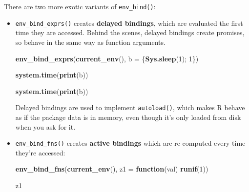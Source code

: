 \documentclass[]{book}
\newenvironment{Shaded}{\begin{snugshade}}{\end{snugshade}}
\newcommand{\ControlFlowTok}[1]{\textcolor[rgb]{0.13,0.29,0.53}{\textbf{#1}}}
\newcommand{\DataTypeTok}[1]{\textcolor[rgb]{0.13,0.29,0.53}{#1}}
\newcommand{\DecValTok}[1]{\textcolor[rgb]{0.00,0.00,0.81}{#1}}
\newcommand{\KeywordTok}[1]{\textcolor[rgb]{0.13,0.29,0.53}{\textbf{#1}}}
\newcommand{\NormalTok}[1]{#1}
\theoremstyle{definition}
\theoremstyle{definition}
\theoremstyle{definition}
\theoremstyle{remark}
\begin{document}
There are two more exotic variants of \texttt{env\_bind()}:

\begin{itemize}
\item
  \texttt{env\_bind\_exprs()} creates \textbf{delayed bindings}, which
  are evaluated the first time they are accessed. Behind the scenes,
  delayed bindings create promises, so behave in the same way as
  function arguments.

\begin{Shaded}
\begin{Highlighting}[]
\KeywordTok{env_bind_exprs}\NormalTok{(}\KeywordTok{current_env}\NormalTok{(), }\DataTypeTok{b =}\NormalTok{ \{}\KeywordTok{Sys.sleep}\NormalTok{(}\DecValTok{1}\NormalTok{); }\DecValTok{1}\NormalTok{\})}
\end{Highlighting}
\end{Shaded}

\begin{Shaded}
\begin{Highlighting}[]
\KeywordTok{system.time}\NormalTok{(}\KeywordTok{print}\NormalTok{(b))}
\end{Highlighting}
\end{Shaded}

\begin{Shaded}
\begin{Highlighting}[]
\KeywordTok{system.time}\NormalTok{(}\KeywordTok{print}\NormalTok{(b))}
\end{Highlighting}
\end{Shaded}

  Delayed bindings are used to implement \texttt{autoload()}, which
  makes R behave as if the package data is in memory, even though it's
  only loaded from disk when you ask for it.
\item
  \texttt{env\_bind\_fns()} creates \textbf{active bindings} which are
  re-computed every time they're accessed:

\begin{Shaded}
\begin{Highlighting}[]
\KeywordTok{env_bind_fns}\NormalTok{(}\KeywordTok{current_env}\NormalTok{(), }\DataTypeTok{z1 =} \ControlFlowTok{function}\NormalTok{(val) }\KeywordTok{runif}\NormalTok{(}\DecValTok{1}\NormalTok{))}
\end{Highlighting}
\end{Shaded}

\begin{Shaded}
\begin{Highlighting}[]
\NormalTok{z1}
\end{Highlighting}
\end{Shaded}


\end{itemize}
\end{document}
